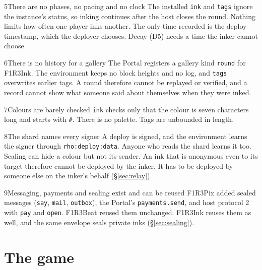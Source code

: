 \documentclass[11pt,a4paper]{article}
\newcommand{\code}[1]{\texttt{#1}}
\begin{document}
\begin{finding}{5}{There are no phases, no pacing and no clock}
The installed \code{ink} and \code{tags} ignore the instance's status, so inking continues after
the host closes the round. Nothing limits how often one player inks another. The only time
recorded is the deploy timestamp, which the deployer chooses. Decay (D5) needs a time the
inker cannot choose.
\end{finding}

\begin{finding}{6}{There is no history for a gallery}
The Portal registers a gallery kind \code{round} for F1R3Ink. The environment keeps no block
heights and no log, and \code{tags} overwrites earlier tags. A round therefore cannot be
replayed or verified, and a record cannot show what someone said about themselves when they
were inked.
\end{finding}

\begin{finding}{7}{Colours are barely checked}
\code{ink} checks only that the colour is seven characters long and starts with \code{\#}. There
is no palette. Tags are unbounded in length.
\end{finding}

\begin{finding}{8}{The shard names every signer}
A deploy is signed, and the environment learns the signer through \code{rho:deploy:data}.
Anyone who reads the shard learns it too. Sealing can hide a colour but not its sender. An ink
that is anonymous even to its target therefore cannot be deployed by the inker. It has to be
deployed by someone else on the inker's behalf (\S\ref{sec:relay}).
\end{finding}

\begin{finding}{9}{Messaging, payments and sealing exist and can be reused}
F1R3Pix added sealed messages (\code{say}, \code{mail}, \code{outbox}), the Portal's
\code{payments.send}, and host protocol 2 with \code{pay} and \code{open}. F1R3Beat reused them
unchanged. F1R3Ink reuses them as well, and the same envelope seals private inks
(\S\ref{sec:sealing}).
\end{finding}

\section{The game}\label{sec:game}
\end{document}
